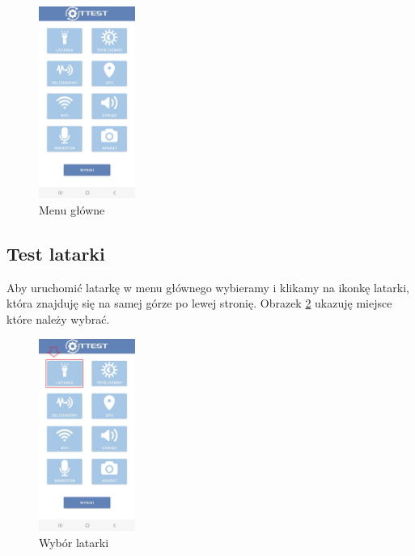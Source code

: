 \newpage


\begin{figure}[!hbt]
	\begin{center}
		\includegraphics[angle=360, width=0.28\textwidth]{rys/punkt6/menu1.jpg}
		\caption{Menu główne}
		\label{rys:menu1}
	\end{center}
\end{figure}


\subsection{Test latarki} 

Aby uruchomić latarkę w menu głównego wybieramy i klikamy na ikonkę latarki, która znajduję się na samej górze po lewej stronię. 
\newline
Obrazek \ref{rys:latarka1} ukazuję miejsce które należy wybrać. 

\begin{figure}[!hbt]
	\begin{center}
		\includegraphics[angle=360, width=0.28\textwidth]{rys/punkt6/latarka1.jpg}
		\caption{Wybór latarki}
		\label{rys:latarka1}
	\end{center}
\end{figure}

